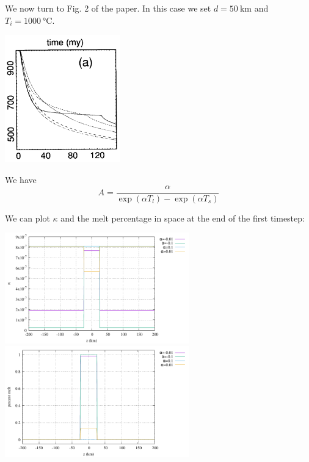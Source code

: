 We now turn to Fig. 2 of the paper. In this case we set $d=50~\si{\km}$ 
and $T_i=1000~\si{\celsius}$. 

\begin{center}
\includegraphics[width=5cm]{python_codes/fieldstone_169/images/fig2}
\end{center}

We have 
\[
A= \frac{\alpha }{\exp(\alpha T_l) - \exp(\alpha T_s) } 
\]


We can plot $\kappa$ and the melt percentage in space at the end of the first timestep:
\begin{center}
\includegraphics[width=8cm]{python_codes/fieldstone_169/results/nonlinear/zero/kappa.pdf}
\includegraphics[width=8cm]{python_codes/fieldstone_169/results/nonlinear/zero/melt.pdf}
\end{center}


